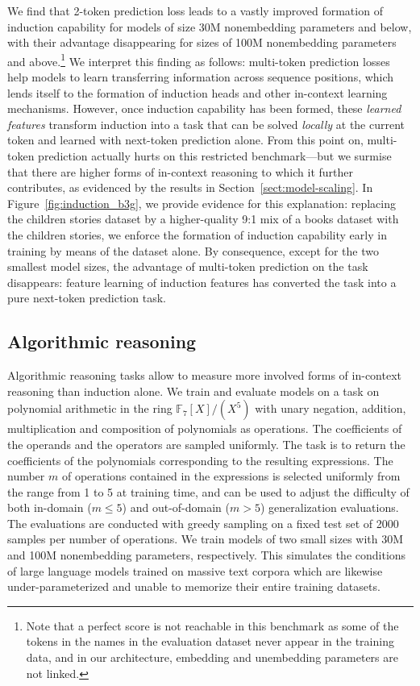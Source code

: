 We find that 2-token prediction loss leads to a vastly improved formation of induction capability for models of size 30M nonembedding parameters and below, with their advantage disappearing for sizes of 100M nonembedding parameters and above.\footnote{Note that a perfect score is not reachable in this benchmark as some of the tokens in the names in the evaluation dataset never appear in the training data, and in our architecture, embedding and unembedding parameters are not linked.}
We interpret this finding as follows: multi-token prediction losses help models to learn transferring information across sequence positions, which lends itself to the formation of induction heads and other in-context learning mechanisms. However, once induction capability has been formed, these \emph{learned features} transform induction into a task that can be solved \emph{locally} at the current token and learned with next-token prediction alone. From this point on, multi-token prediction actually hurts on this restricted benchmark---but we surmise that there are higher forms of in-context reasoning to which it further contributes, as evidenced by the results in Section~\ref{sect:model-scaling}. In Figure~\ref{fig:induction_b3g}, we provide evidence for this explanation: replacing the children stories dataset by a higher-quality 9:1 mix of a books dataset with the children stories, we enforce the formation of induction capability early in training by means of the dataset alone. By consequence, except for the two smallest model sizes, the advantage of multi-token prediction on the task disappears: feature learning  of induction features has converted the task into a pure next-token prediction task.

\subsection{Algorithmic reasoning}
\label{sect:algorithmic}

Algorithmic reasoning tasks allow to measure more involved forms of in-context reasoning than induction alone. We train and evaluate models on a task on polynomial arithmetic in the ring $\mathbb{F}_7[X]/(X^5)$ with unary negation, addition, multiplication and composition of polynomials as operations. The coefficients of the operands and the operators are sampled uniformly. %
The task is to return the coefficients of the polynomials corresponding to the resulting expressions. The number $m$ of operations contained in the expressions is selected uniformly from the range from 1 to 5 at training time, and can be used to adjust the difficulty of both in-domain ($m \leq 5$) and out-of-domain ($m > 5$) generalization evaluations. The evaluations are conducted with greedy sampling on a fixed test set of 2000 samples per number of operations. We train models of two small sizes with 30M and 100M nonembedding parameters, respectively. This simulates the conditions of large language models trained on massive text corpora which are likewise under-parameterized and unable to memorize their entire training datasets.

